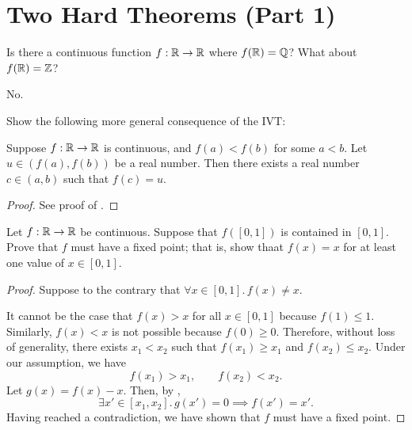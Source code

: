 \section{Two Hard Theorems (Part 1)}

\begin{problem}
  Is there a continuous function $f : \mathbb{R} \to \mathbb{R}$ where $f(\mathbb{R}) = \mathbb{Q}$? What about $f(\mathbb{R}) = \mathbb{Z}$?

  \vspace{\baselineskip}

  No.

\end{problem}

\begin{problem}
  Show the following more general consequence of the IVT:

  Suppose $f: \mathbb{R} \to \mathbb{R}$ is continuous, and $f(a) < f(b)$ for some $a < b$. Let
  $u \in (f(a), f(b))$ be a real number. Then there exists a real number $c \in
  (a, b)$ such that $f(c) = u$.

  \begin{proof} 
    See proof of .
  \end{proof} 
\end{problem}

\begin{problem}
  Let $f : \mathbb{R} \to \mathbb{R}$ be continuous. Suppose that $f([0, 1])$ is contained in $[0, 1]$. Prove that 
  $f$ must have a fixed point; that is, show thaat $f(x) = x$ for at least one value of $x \in [0, 1]$.

  \begin{proof}
    Suppose to the contrary that $\forall x \in [0, 1].\, f(x) \neq x$.

    It cannot be the case that $f(x) > x$ for all $x \in [0, 1]$ because $f(1)
    \leq 1$. Similarly, $f(x) < x$ is not possible because $f(0) \geq 0$.
    Therefore, without loss of generality, there exists $x_{1} < x_{2}$ such
    that $f(x_{1}) \geq x_{1}$ and $f(x_{2}) \leq x_{2}$. Under our assumption,
    we have
    \[
      f(x_{1}) > x_{1}, \qquad f(x_{2}) < x_{2}.
    \]
    Let $g(x) = f(x) - x$. Then, by ,
    \[
      \exists x' \in [x_{1}, x_{2}].\, g(x') = 0 \implies f(x') = x'.
    \]
    Having reached a contradiction, we have shown that $f$ must have a fixed point.
  \end{proof}
\end{problem}

